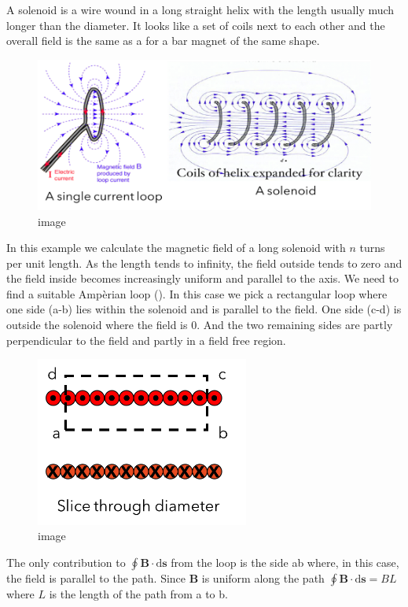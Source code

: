 \documentclass[
]{book}
\numberwithin{equation}{section}
\begin{document}
A solenoid is a wire wound in a long straight helix with the length
usually much longer than the diameter. It looks like a set of coils next
to each other and the overall field is the same as a for a bar magnet of
the same shape.

\begin{figure}
\centering
\includegraphics[width=120mm,height=\textheight]{Figures/loopNsolenoid.png}
\caption{image}
\end{figure}

In this example we calculate the magnetic field of a long solenoid with
\(n\) turns per unit length. As the length tends to infinity, the field
outside tends to zero and the field inside becomes increasingly uniform
and parallel to the axis. We need to find a suitable Ampèrian loop ().
In this case we pick a rectangular loop where one side (a-b) lies within
the solenoid and is parallel to the field. One side (c-d) is outside the
solenoid where the field is 0. And the two remaining sides are partly
perpendicular to the field and partly in a field free region.

\begin{figure}
\centering
\includegraphics[width=70mm,height=\textheight]{Figures/amperianLoop.png}
\caption{image}
\end{figure}

The only contribution to \(\oint \mathbf{B} \cdot \mathrm{d}\mathbf{s}\) from the loop is the side
ab where, in this case, the field is parallel to the path. Since \(\mathbf{B}\) is
uniform along the path \(\oint \mathbf{B} \cdot \mathrm{d}\mathbf{s} = BL\) where \(L\) is the
length of the path from a to b.
\end{document}
